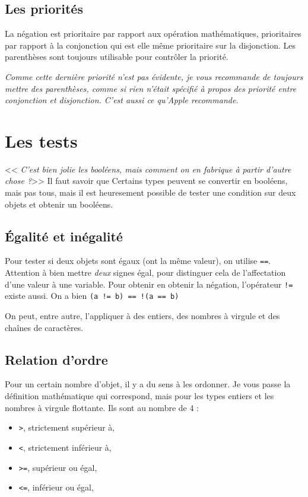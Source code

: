 \subsection{Les priorités}
La négation est prioritaire par rapport aux opération mathématiques, prioritaires par rapport à la conjonction qui est elle même prioritaire sur la disjonction. Les parenthèses sont toujours utilisable pour contrôler la priorité.

\emph{Comme cette dernière priorité n'est pas évidente, je vous recommande de toujours mettre des parenthèses, comme si rien n'était spécifié à propos des priorité entre conjonction et disjonction. C'est aussi ce qu'\emph{Apple} recommande.}
\section{Les tests}
<< \emph{C'est bien jolie les booléens, mais comment on en fabrique à partir d'autre chose ?}>>
Il faut savoir que Certains types peuvent se convertir en booléens, mais pas tous, mais il est heuresement possible de tester une condition sur deux objets et obtenir un booléens.
\subsection{Égalité et inégalité}
Pour tester si deux objets sont égaux (ont la même valeur),
on utilise \verb"==". Attention à bien mettre \emph{deux} signes égal, pour distinguer cela de l'affectation d'une valeur à une variable. Pour obtenir en obtenir la négation, l'opérateur \verb"!=" existe aussi. On a bien \texttt{(a != b) == !(a == b)}

On peut, entre autre, l'appliquer à des entiers, des nombres à virgule et des chaînes de caractères.
\subsection{Relation d'ordre}
Pour un certain nombre d'objet, il y a du sens à les ordonner.
Je vous passe la définition mathématique qui correspond, mais pour les types entiers et les nombres à virgule flottante.
Ils sont au nombre de 4 :
\begin{itemize}
\item \verb">", strictement supérieur à,
\item \verb"<", strictement inférieur à,
\item \verb">=", supérieur ou égal,
\item \verb"<=", inférieur ou égal,
\end{itemize}

